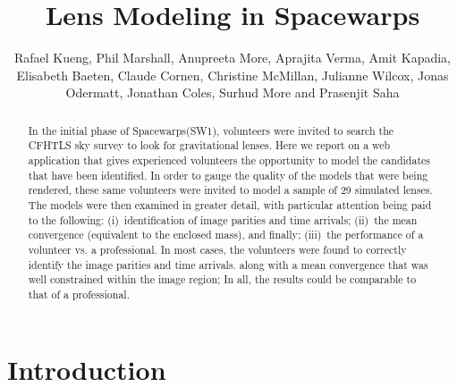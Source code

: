 \documentclass[12pt,preprint]{aastex}
\newcommand{\sw}{Spacewarps\xspace}
\begin{document}
\title{Lens Modeling in \sw}
\author{Rafael Kueng,
Phil Marshall,
Anupreeta More,
Aprajita Verma,
Amit Kapadia,
Elisabeth Baeten,
Claude Cornen,
Christine McMillan,
Julianne Wilcox,
Jonas Odermatt,
Jonathan Coles,
Surhud More
and Prasenjit Saha
}

\begin{abstract}
In the initial phase of \sw (SW1), volunteers were invited to search the CFHTLS sky survey to look for gravitational lenses.
Here we report on a web application that gives experienced volunteers the opportunity to model the candidates that have been identified.
In order to gauge the quality of the models that were being rendered, these same volunteers were invited to model a sample of 29 simulated lenses.
The models were then examined in greater detail, with particular attention being paid to the following:
(i)~identification of image parities and time arrivals;
(ii)~the mean convergence (equivalent to the enclosed mass), and finally;
(iii)~the performance of a volunteer vs. a professional.
In most cases, the volunteers were found to correctly identify the image parities and time arrivals.
 along with a mean convergence that was well constrained within the image region;
In all, the results could be comparable to that of a professional.


\end{abstract}

\keywords{}
\section{Introduction}
\end{document}
